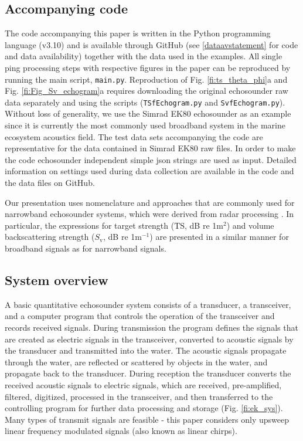 \documentclass[preprint,12pt,TurnOnLineNumbers]{JASAnew}
\newcommand{\ek}{Simrad EK80}
\newcommand{\ts}{\textrm{TS}}
\newcommand{\sv}{S_{\textrm{v}}}
\newcommand{\code}[1]{\texttt{#1}}
\begin{document}
\subsection{Accompanying code}
The code  accompanying this paper is written in the Python programming language (v3.10) and is available through GitHub (see \ref{dataavstatement} for code and data availability) together with the data used in the examples. All single ping processing steps with respective figures in the paper can be reproduced by running the main script, \code{main.py}. Reproduction of Fig. \ref{fi:ts_theta_phi}a and Fig. \ref{fi:Fig_Sv_echogram}a requires downloading the original echosounder raw data separately and using the scripts (\code{TSfEchogram.py} and \code{SvfEchogram.py}). Without loss of generality, we use the \ek{} echosounder as an example since it is currently the most commonly used broadband system in the marine ecosystem acoustics field. The test data sets accompanying the code are representative for the data contained in Simrad EK80 raw files. In order to make the code echosounder independent simple json strings are used as input. Detailed information on settings used during data collection are available in the code and the data files on GitHub.

Our presentation uses nomenclature and approaches that are commonly used for narrowband echosounder systems, which were derived from radar processing \citep{cook1967}. In particular, the expressions for target strength ($\ts$, dB re 1m${^2}$) and volume backscattering strength ($\sv$, dB re 1m$^{-1}$) \citep{MacLennan2002consistent} are presented in a similar manner for broadband signals as for narrowband signals.

\subsection{System overview}
A basic quantitative echosounder system consists of a transducer, a transceiver, and a computer program that controls the operation of the transceiver and records received signals. During transmission the program defines the signals that are created as electric signals in the transceiver, converted to acoustic signals by the transducer and transmitted into the water. The acoustic signals propagate through the water, are reflected or scattered by objects in the water, and propagate back to the transducer. During reception the transducer converts the received acoustic signals to electric signals, which are received, pre-amplified, filtered, digitized, processed in the transceiver, and then transferred to the controlling program for further data processing and storage (Fig. \ref{fi:ek_sys}). Many types of transmit signals are feasible - this paper considers only upsweep linear frequency modulated signals (also known as linear chirps).
\end{document}
